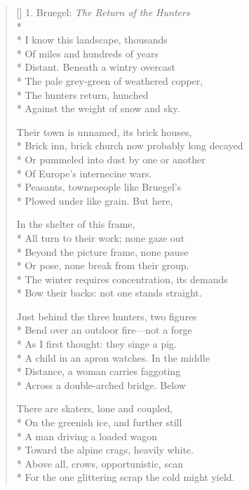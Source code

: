\label{ch:the_cold}
\settowidth{\versewidth}{For the one glittering scrap the cold might yield.}
\begin{verse}[\versewidth]
1. Bruegel: \textit{The Return of the Hunters}\\*
~\\*
I know this landscape, thousands\\*
Of miles and hundreds of years\\*
Distant.  Beneath a wintry overcast\\*
The pale grey-green of weathered copper,\\*
The hunters return, hunched\\*
Against the weight of snow and sky.

Their town is unnamed, its brick houses,\\*
Brick inn, brick church now probably long decayed\\*
Or pummeled into dust by one or another\\*
Of Europe's internecine wars.\\*
Peasants, townspeople like Bruegel's\\*
Plowed under like grain.   But here,

In the shelter of this frame,\\*
All turn to their work; none gaze out\\*
Beyond the picture frame, none pause\\*
Or pose, none break from their group.\\*
The winter requires concentration, its demands\\*
Bow their backs: not one stands straight.

Just behind the three hunters, two figures\\*
Bend over an outdoor fire---not a forge\\*
As I first thought: they singe a pig.\\*
A child in an apron watches. In the middle\\*
Distance, a woman carries faggoting \\*
Across a double-arched bridge. Below

There are skaters, lone and coupled,\\*
On the greenish ice, and further still\\*
A man driving a loaded wagon\\*
Toward the alpine crags, heavily white.\\*
Above all, crows, opportunistic, scan\\*
For the one glittering scrap the cold might yield.


\end{verse}
